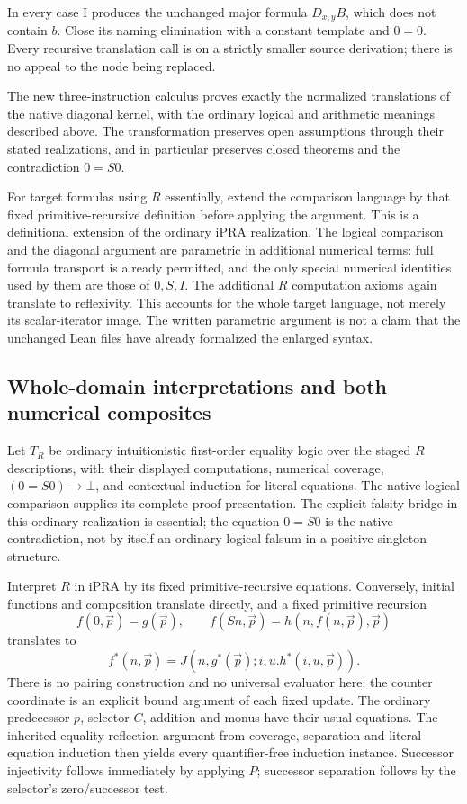 In every case I produces the unchanged major formula $D_{x,y}B$, which
does not contain $b$.  Close its naming elimination with a constant
template and $0=0$.  Every recursive translation call is on a strictly
smaller source derivation; there is no appeal to the node being replaced.

\begin{theorem}
The new three-instruction calculus proves exactly the normalized
translations of the native diagonal kernel, with the ordinary logical
and arithmetic meanings described above.  The transformation preserves
open assumptions through their stated realizations, and in particular
preserves closed theorems and the contradiction $0=S0$.
\end{theorem}

For target formulas using $R$ essentially, extend the comparison language
by that fixed primitive-recursive definition before applying the argument.
This is a definitional extension of the ordinary iPRA realization.  The
logical comparison and the diagonal argument are parametric in additional
numerical terms: full formula transport is already permitted, and the only
special numerical identities used by them are those of $0,S,I$.
The additional $R$ computation axioms again translate to reflexivity.
This accounts for the whole target language, not merely its scalar-iterator
image.  The written parametric argument is not a claim that the unchanged
Lean files have already formalized the enlarged syntax.

\subsection{Whole-domain interpretations and both numerical composites}

Let $T_R$ be ordinary intuitionistic first-order equality logic over the
staged $R$ descriptions, with their displayed computations, numerical
coverage, $(0=S0)\to\bot$, and contextual induction for literal equations.
The native logical comparison supplies its complete proof presentation.
The explicit falsity bridge in this ordinary realization is essential;
the equation $0=S0$ is the native contradiction, not by itself an ordinary
logical falsum in a positive singleton structure.

Interpret $R$ in iPRA by its fixed primitive-recursive equations.
Conversely, initial functions and composition translate directly, and a
fixed primitive recursion
\[
 f(0,\vec p)=g(\vec p),\qquad
 f(Sn,\vec p)=h(n,f(n,\vec p),\vec p)
\]
translates to
\[
                f^*(n,\vec p)=J(n,g^*(\vec p);i,u.h^*(i,u,\vec p)).
\]
There is no pairing construction and no universal evaluator here: the
counter coordinate is an explicit bound argument of each fixed update.
The ordinary predecessor $p$, selector $C$, addition and monus have their
usual equations.  The inherited equality-reflection argument from coverage,
separation and literal-equation induction then yields every quantifier-free
induction instance.  Successor injectivity follows immediately by applying
$P$; successor separation follows by the selector's zero/successor test.

